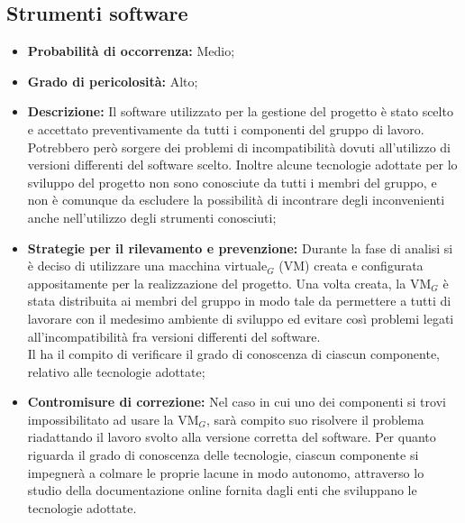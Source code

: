 \subsection{Strumenti software}
\begin{itemize}
\item \textbf{Probabilità di occorrenza:} Medio;
\item \textbf{Grado di pericolosità:} Alto;
\item \textbf{Descrizione:} Il software utilizzato per la gestione del progetto è stato scelto e accettato preventivamente da tutti i componenti del gruppo di lavoro. Potrebbero però sorgere dei problemi di incompatibilità dovuti all'utilizzo di versioni differenti del software scelto. Inoltre alcune tecnologie adottate per lo sviluppo del progetto non sono conosciute da tutti i membri del gruppo, e non è comunque da escludere la possibilità di incontrare degli inconvenienti anche nell'utilizzo degli strumenti conosciuti;

\item \textbf{Strategie per il rilevamento e prevenzione:} Durante la fase di analisi si è deciso di utilizzare una macchina virtuale$_G$ (VM) creata e configurata appositamente per la realizzazione del progetto. Una volta creata, la VM$_G$ è stata distribuita ai membri del gruppo in modo tale da permettere a tutti di lavorare con il medesimo ambiente di sviluppo ed evitare così problemi legati all'incompatibilità fra versioni differenti del software. \\
Il \ruoloResponsabile ha il compito di verificare il grado di conoscenza di ciascun componente, relativo alle tecnologie adottate; 
\item \textbf{Contromisure di correzione:} Nel caso in cui uno dei componenti si trovi impossibilitato ad usare la VM$_G$, sarà compito suo risolvere il problema riadattando il lavoro svolto alla versione corretta del software.
Per quanto riguarda il grado di conoscenza delle tecnologie, ciascun componente si impegnerà a colmare le proprie lacune in modo autonomo, attraverso lo studio della documentazione online fornita dagli enti che sviluppano le tecnologie adottate.
\end{itemize}



